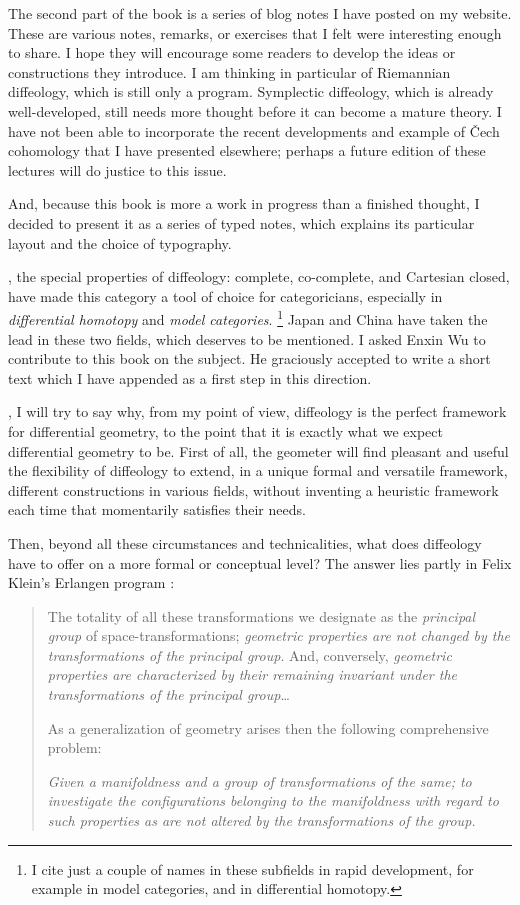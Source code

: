 The second part of the book is a series of blog notes I have posted on my website.
These are various notes,
remarks,
or exercises that I felt were interesting enough to share.
I hope they will encourage some readers to develop the ideas or constructions they introduce.
I am thinking in particular of Riemannian diffeology,
which is still only a program.
Symplectic diffeology,
which is already well-developed,
still needs more thought before it can become a mature theory.
I have not been able to incorporate the recent developments and example of \v{C}ech cohomology that I have presented elsewhere;
perhaps a future edition of these lectures will do justice to this issue.

And,
because this book is more a work in progress than a finished thought,
I decided to present it as a series of typed notes,
which explains its particular layout and the choice of typography.

,
the special properties of diffeology:
complete,
co-complete,
and Cartesian closed,
have made this category a tool of choice for categoricians,
especially in \emph{differential homotopy} and \emph{model categories}.%
\footnote{I cite just a couple of names in these subfields in rapid development,
for example \cite{CW14} in model categories,
and \cite{SYH18, Kih19, Kur20} in differential homotopy.}
Japan and China have taken the lead in these two fields,
which deserves to be mentioned.
I asked Enxin Wu to contribute to this book on the subject.
He graciously accepted to write a short text which I have appended as a first step in this direction.

,
I will try to say why,
from my point of view,
diffeology is the perfect framework for differential geometry,
to the point that it is exactly what we expect differential geometry to be.
First of all,
the geometer will find pleasant and useful the flexibility of diffeology
to extend,
in a unique formal and versatile framework,
different constructions in various fields,
without inventing a heuristic framework each time that momentarily satisfies their needs.

Then,
beyond all these circumstances and technicalities,
what does diffeology have to offer on a more formal or conceptual level?
The answer lies partly in Felix Klein's Erlangen program \cite{Kle72}:

\begin{quote}
  The totality of all these transformations we designate as the {\it principal group} of space-transformations;
  {\it geometric properties are not changed by the transformations of the principal group}.
  And,
  conversely,
  {\it geometric properties are characterized by their remaining invariant under the transformations of the principal group}\dots
  
  As a generalization of geometry arises then the following comprehensive problem:
  
  {\it Given a manifoldness and a group of transformations of the same;
  to investigate the configurations belonging to the manifoldness with regard to such properties as are not altered by the transformations of the group.}
\end{quote}

